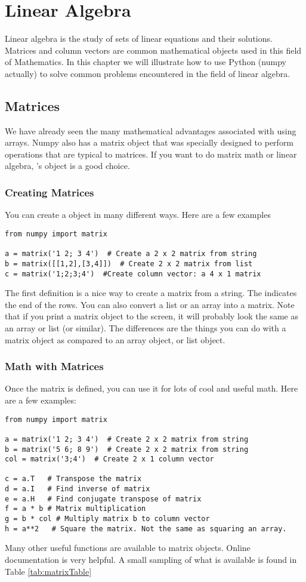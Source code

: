 \chapter{Linear Algebra}
\label{chap:linalg}
Linear algebra is the study of sets of linear equations and their
solutions.  Matrices and column vectors are common mathematical
objects used in this field of Mathematics.  In this chapter we will
illustrate how to use Python (numpy actually) to solve common problems
encountered in the field of linear algebra.
\section{Matrices}
We have already seen the many mathematical advantages associated with
using arrays.  Numpy also has a matrix object that was specially
designed to perform operations that are typical to matrices.  If you
want to do matrix math or linear algebra, 's 
object is a good choice.

\subsection*{Creating Matrices}
You can create a  object in many different ways.  Here are a few examples
\begin{Verbatim}
from numpy import matrix

a = matrix('1 2; 3 4')  # Create a 2 x 2 matrix from string
b = matrix([[1,2],[3,4]])  # Create 2 x 2 matrix from list
c = matrix('1;2;3;4')  #Create column vector: a 4 x 1 matrix
\end{Verbatim}
The first definition is a nice way to create a matrix from a string.
The \code{;} indicates the end of the rows.  You can also convert a
list or an array into a matrix.  Note that if you print a matrix object
to the screen, it will probably look the same as an array or list (or
similar).  The differences are the things you can do with a matrix
object as compared to an array object, or list object.

\subsection*{Math with Matrices}
Once the matrix is defined, you can use it for lots of cool and useful math.  Here are a few examples:

\begin{Verbatim}
from numpy import matrix

a = matrix('1 2; 3 4')  # Create 2 x 2 matrix from string
b = matrix('5 6; 8 9')  # Create 2 x 2 matrix from string
col = matrix('3;4')  # Create 2 x 1 column vector

c = a.T   # Transpose the matrix
d = a.I   # Find inverse of matrix
e = a.H   # Find conjugate transpose of matrix
f = a * b # Matrix multiplication
g = b * col # Multiply matrix b to column vector
h = a**2   # Square the matrix. Not the same as squaring an array.
\end{Verbatim}
 Many other useful functions are available to matrix objects.  Online
 documentation is very helpful.  A small sampling of what is available
 is found in Table \ref{tab:matrixTable}

